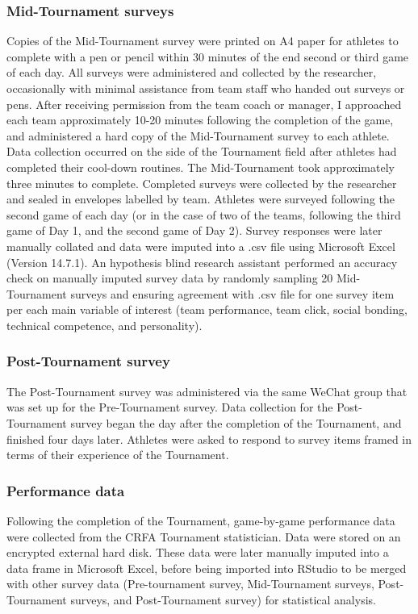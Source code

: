 \begin{CJK}{UTF8}{gbsn}
\subsubsection{Mid-Tournament surveys}
Copies of the Mid-Tournament survey were printed on A4 paper for athletes to complete with a pen or pencil within 30 minutes of the end second or third game of each day.  All surveys were administered and collected by the researcher, occasionally with minimal assistance from team staff who handed out surveys or pens. After receiving permission from the team coach or manager, I approached each team approximately 10-20 minutes following the completion of the game, and administered a hard copy of the Mid-Tournament survey to each athlete.  Data collection occurred on the side of the Tournament field after athletes had completed their cool-down routines.  The Mid-Tournament took approximately three minutes to complete. Completed surveys were collected by the researcher and sealed in envelopes labelled by team. Athletes were surveyed following the second game of each day (or in the case of two of the teams, following the third game of Day 1, and the second game of Day 2).  Survey responses were later manually collated and data were imputed into a .csv file using Microsoft Excel (Version 14.7.1).  An hypothesis blind research assistant performed an accuracy check on manually imputed survey data by randomly sampling 20 Mid-Tournament surveys and ensuring agreement with .csv file for one survey item per each main variable of interest (team performance, team click, social bonding, technical competence, and personality).

\subsubsection{Post-Tournament survey}
The Post-Tournament survey was administered via the same WeChat group that was set up for the Pre-Tournament survey. Data collection for the Post-Tournament survey began the day after the completion of the Tournament, and finished four days later. Athletes were asked to respond to survey items framed in terms of their experience of the Tournament.

\subsubsection{Performance data}
Following the completion of the Tournament, game-by-game performance data were collected from the CRFA Tournament statistician.  Data were stored on an encrypted external hard disk. These data were later manually imputed into a data frame in Microsoft Excel, before being imported into RStudio to be merged with other survey data (Pre-tournament survey, Mid-Tournament surveys, Post-Tournament surveys, and Post-Tournament survey) for statistical analysis.


\end{CJK}
